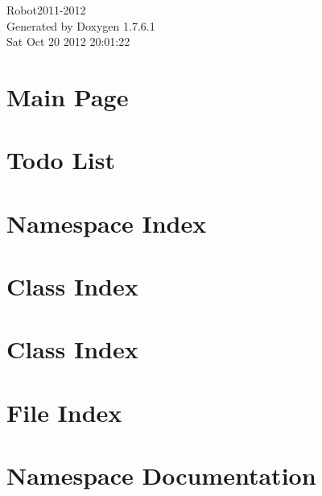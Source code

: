 \documentclass[a4paper]{book}
\begin{document}
\hypersetup{pageanchor=false,citecolor=blue}
\begin{titlepage}
\vspace*{7cm}
\begin{center}
{\Large \-Robot2011-\/2012 }\\
\vspace*{1cm}
{\large \-Generated by Doxygen 1.7.6.1}\\
\vspace*{0.5cm}
{\small Sat Oct 20 2012 20:01:22}\\
\end{center}
\end{titlepage}
\clearemptydoublepage
{}
\tableofcontents
\clearemptydoublepage
{}
\hypersetup{pageanchor=true,citecolor=blue}
\chapter{\-Main \-Page}
\label{index}\hypertarget{index}{}
\chapter{\-Todo \-List}
\label{todo}
\hypertarget{todo}{}

\chapter{\-Namespace \-Index}

\chapter{\-Class \-Index}

\chapter{\-Class \-Index}

\chapter{\-File \-Index}

\chapter{\-Namespace \-Documentation}






\end{document}
